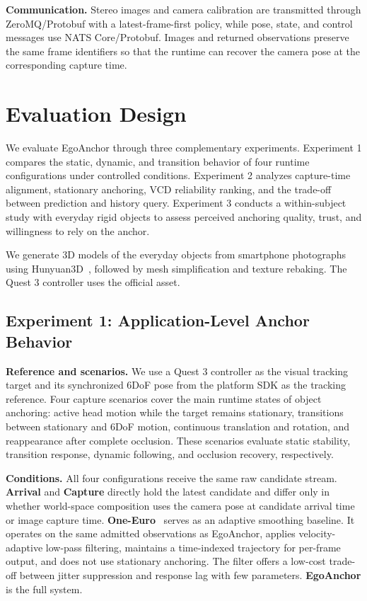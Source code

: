 \documentclass[review]{vgtc}
\begin{document}
\textbf{Communication.}
Stereo images and camera calibration are transmitted through ZeroMQ/Protobuf with a latest-frame-first policy, while pose, state, and control messages use NATS Core/Protobuf. Images and returned observations preserve the same frame identifiers so that the runtime can recover the camera pose at the corresponding capture time.

\section{Evaluation Design}\label{sec:evaluation}

We evaluate EgoAnchor through three complementary experiments. Experiment 1 compares the static, dynamic, and transition behavior of four runtime configurations under controlled conditions. Experiment 2 analyzes capture-time alignment, stationary anchoring, VCD reliability ranking, and the trade-off between prediction and history query. Experiment 3 conducts a within-subject study with everyday rigid objects to assess perceived anchoring quality, trust, and willingness to rely on the anchor.

We generate 3D models of the everyday objects from smartphone photographs using Hunyuan3D~\cite{hunyuan3d22025tencent}, followed by mesh simplification and texture rebaking. The Quest 3 controller uses the official asset.

\subsection{Experiment 1: Application-Level Anchor Behavior}\label{sec:exp1-design}

\textbf{Reference and scenarios.}
We use a Quest 3 controller as the visual tracking target and its synchronized 6DoF pose from the platform SDK as the tracking reference. Four capture scenarios cover the main runtime states of object anchoring: active head motion while the target remains stationary, transitions between stationary and 6DoF motion, continuous translation and rotation, and reappearance after complete occlusion. These scenarios evaluate static stability, transition response, dynamic following, and occlusion recovery, respectively.

\textbf{Conditions.}
All four configurations receive the same raw candidate stream. \textbf{Arrival} and \textbf{Capture} directly hold the latest candidate and differ only in whether world-space composition uses the camera pose at candidate arrival time or image capture time. \textbf{One-Euro}~\cite{casiez2012oneeuro} serves as an adaptive smoothing baseline. It operates on the same admitted observations as EgoAnchor, applies velocity-adaptive low-pass filtering, maintains a time-indexed trajectory for per-frame output, and does not use stationary anchoring. The filter offers a low-cost trade-off between jitter suppression and response lag with few parameters. \textbf{EgoAnchor} is the full system.
\end{document}
